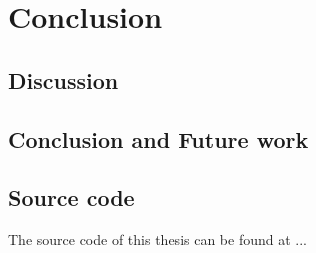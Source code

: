 \documentclass[UKenglish]{ifimaster}
\begin{document}
\part{Conclusion}
\chapter{Discussion}
\label{chapter:discussion}


\chapter{Conclusion and Future work}
\label{chapter:conclusion}


\backmatter{}
\printbibliography

\begin{appendices}
\chapter{Source code}
\label{appendix:source_code}
The source code of this thesis can be found at ...
\end{appendices}
\end{document}
